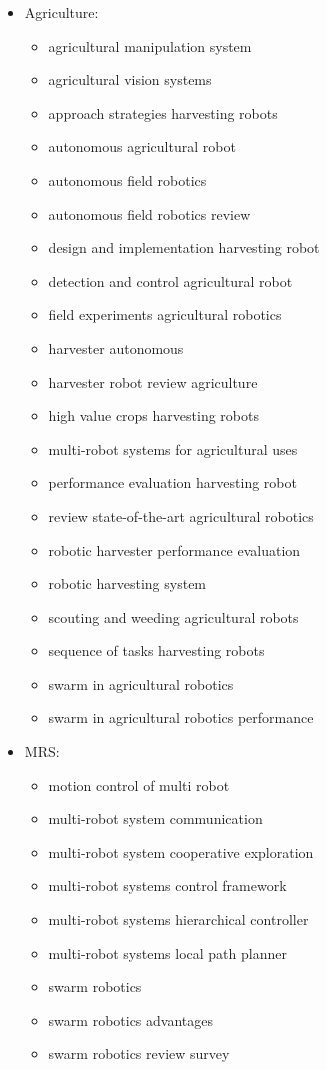     \begin{itemize}
        \item Agriculture: \ \begin{itemize}
            \item agricultural manipulation system
            \item agricultural vision systems
            \item approach strategies harvesting robots
            \item autonomous agricultural robot
            \item autonomous field robotics
            \item autonomous field robotics review
            \item design and implementation harvesting robot
            \item detection and control agricultural robot
            \item field experiments agricultural robotics
            \item harvester autonomous
            \item harvester robot review agriculture
            \item high value crops harvesting robots
            \item multi-robot systems for agricultural uses
            \item performance evaluation harvesting robot        
            \item review state-of-the-art agricultural robotics
            \item robotic harvester performance evaluation
            \item robotic harvesting system
            \item scouting and weeding agricultural robots
            \item sequence of tasks harvesting robots
            \item swarm in agricultural robotics
            \item swarm in agricultural robotics performance
        \end{itemize}
        \item MRS: \ \begin{itemize}
            \item motion control of multi robot
            \item multi-robot system  communication
            \item multi-robot system cooperative exploration
            \item multi-robot systems control framework
            \item multi-robot systems hierarchical controller
            \item multi-robot systems local path planner
            \item swarm robotics
            \item swarm robotics advantages
            \item swarm robotics review survey
        \end{itemize}
        
    \end{itemize}
